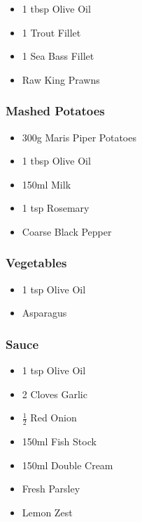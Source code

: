 \documentclass[11pt, english]{article}
\begin{document}
	\begin{itemize}
        \setlength\itemsep{0cm}
                \item 1 tbsp Olive Oil
		\item 1 Trout Fillet
		\item 1 Sea Bass Fillet
		\item Raw King Prawns
        \end{itemize}

		\subsubsection*{Mashed Potatoes}

	\begin{itemize}
        \setlength\itemsep{0cm}
                \item 300g Maris Piper Potatoes
		\item 1 tbsp Olive Oil
		\item 150ml Milk
		\item 1 tsp Rosemary
		\item Coarse Black Pepper
        \end{itemize}

		\subsubsection*{Vegetables}

	\begin{itemize}
        \setlength\itemsep{0cm}
                \item 1 tsp Olive Oil
		\item Asparagus
        \end{itemize}
	
		\subsubsection*{Sauce}

	\begin{itemize}
        \setlength\itemsep{0cm}
                \item 1 tsp Olive Oil
		\item 2 Cloves Garlic
		\item $\frac{1}{2}$ Red Onion
		\item 150ml Fish Stock
		\item 150ml Double Cream
		\item Fresh Parsley
		\item Lemon Zest
        \end{itemize}
\end{document}
